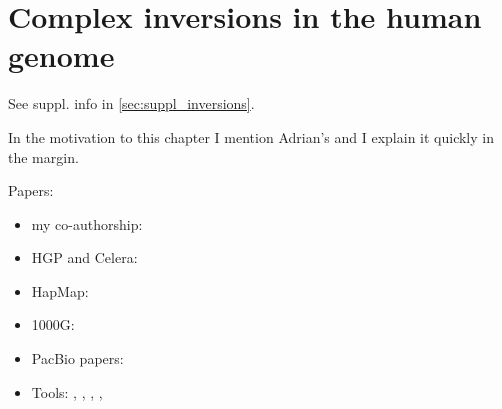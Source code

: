 \chapter{Complex inversions in the human genome}
\label{sec:inversions}

See suppl. info in \cref{sec:suppl_inversions}.

In the motivation to this chapter I mention Adrian's  and I explain it quickly in the margin.


Papers:
\begin{itemize}
\item my co-authorship: \citep{Sudmant2015}
\item HGP and Celera: \citep{Lander2001,Venter2001}
\item HapMap: \citep{InternationalHapMapConsortium2005,Frazer2007,Altshuler2010}
\item 1000G: \citep{Durbin2010,1000GenomesProjectConsortium2012,Auton2015}
\item PacBio papers: \citep{Chaisson2014,Pendleton2015}
\item Tools: \blasr, \last, \mummer, \bwamem, \quiver
\end{itemize}



%
%
%
%

